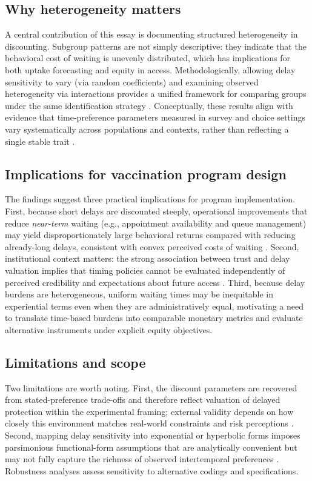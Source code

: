 \documentclass[doublespacing]{utdthesis}
\let\cite=\citep
\begin{document}
\subsection*{Why heterogeneity matters}
A central contribution of this essay is documenting structured heterogeneity in discounting. Subgroup patterns are not simply descriptive: they indicate that the behavioral cost of waiting is unevenly distributed, which has implications for both uptake forecasting and equity in access. Methodologically, allowing delay sensitivity to vary (via random coefficients) and examining observed heterogeneity via interactions provides a unified framework for comparing groups under the same identification strategy \cite{McFadden1974,Train2009}. Conceptually, these results align with evidence that time-preference parameters measured in survey and choice settings vary systematically across populations and contexts, rather than reflecting a single stable trait \cite{Bechtel2023}.

\subsection*{Implications for vaccination program design}
The findings suggest three practical implications for program implementation. First, because short delays are discounted steeply, operational improvements that reduce \emph{near-term} waiting (e.g., appointment availability and queue management) may yield disproportionately large behavioral returns compared with reducing already-long delays, consistent with convex perceived costs of waiting \cite{Attema2018}. Second, institutional context matters: the strong association between trust and delay valuation implies that timing policies cannot be evaluated independently of perceived credibility and expectations about future access \cite{Larson2014}. Third, because delay burdens are heterogeneous, uniform waiting times may be inequitable in experiential terms even when they are administratively equal, motivating a need to translate time-based burdens into comparable monetary metrics and evaluate alternative instruments under explicit equity objectives.

\subsection*{Limitations and scope}
Two limitations are worth noting. First, the discount parameters are recovered from stated-preference trade-offs and therefore reflect valuation of delayed protection within the experimental framing; external validity depends on how closely this environment matches real-world constraints and risk perceptions \cite{Bechtel2023}. Second, mapping delay sensitivity into exponential or hyperbolic forms imposes parsimonious functional-form assumptions that are analytically convenient but may not fully capture the richness of observed intertemporal preferences \cite{Frederick2002,Halevy2015}.
 Robustness analyses assess sensitivity to alternative codings and specifications.
\end{document}
